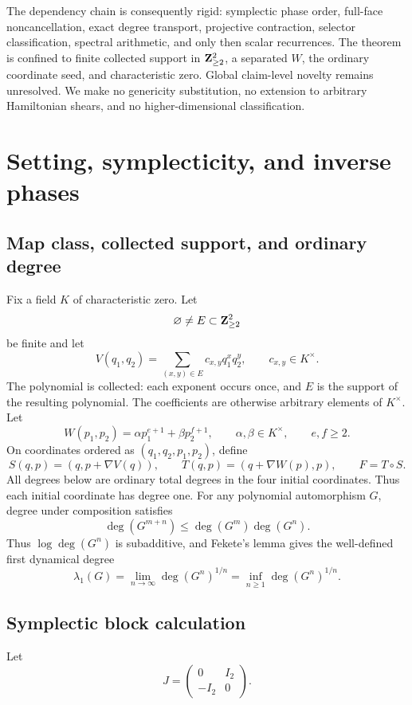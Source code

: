 \documentclass[11pt]{article}
\theoremstyle{definition}
\theoremstyle{remark}
\begin{document}
The dependency chain is consequently rigid: symplectic phase order,
full-face noncancellation, exact degree transport, projective contraction,
selector classification, spectral arithmetic, and only then scalar
recurrences.  The theorem is confined to finite collected support in
\(\mathbf{Z}_{\geq2}^2\), a separated \(W\), the ordinary coordinate seed, and
characteristic zero.  Global claim-level novelty remains unresolved.  We
make no genericity substitution, no extension to arbitrary Hamiltonian
shears, and no higher-dimensional classification.

\section{Setting, symplecticity, and inverse phases}

\subsection{Map class, collected support, and ordinary degree}

Fix a field \(K\) of characteristic zero.  Let
\[
\varnothing\neq E\subset\mathbf{Z}_{\geq2}^2
\]
be finite and let
\[
V(q_1,q_2)=\sum_{(x,y)\in E}c_{x,y}q_1^xq_2^y,
\qquad c_{x,y}\in K^\times.
\]
The polynomial is collected: each exponent occurs once, and \(E\) is the
support of the resulting polynomial.  The coefficients are otherwise
arbitrary elements of \(K^\times\).  Let
\[
W(p_1,p_2)=\alpha p_1^{e+1}+\beta p_2^{f+1},
\qquad \alpha,\beta\in K^\times,\qquad e,f\geq2.
\]
On coordinates ordered as \((q_1,q_2,p_1,p_2)\), define
\[
S(q,p)=(q,p+\nabla V(q)),\qquad
T(q,p)=(q+\nabla W(p),p),\qquad F=T\circ S.
\]
All degrees below are ordinary total degrees in the four initial
coordinates.  Thus each initial coordinate has degree one.
For any polynomial automorphism \(G\), degree under composition satisfies
\[
\deg(G^{m+n})\leq\deg(G^m)\deg(G^n).
\]
Thus \(\log\deg(G^n)\) is subadditive, and Fekete's lemma gives the
well-defined first dynamical degree
\[
\lambda_1(G)=\lim_{n\to\infty}\deg(G^n)^{1/n}
=\inf_{n\geq1}\deg(G^n)^{1/n}.
\]

\subsection{Symplectic block calculation}

Let
\[
J=\begin{pmatrix}0&I_2\\-I_2&0\end{pmatrix}.
\]
\end{document}
